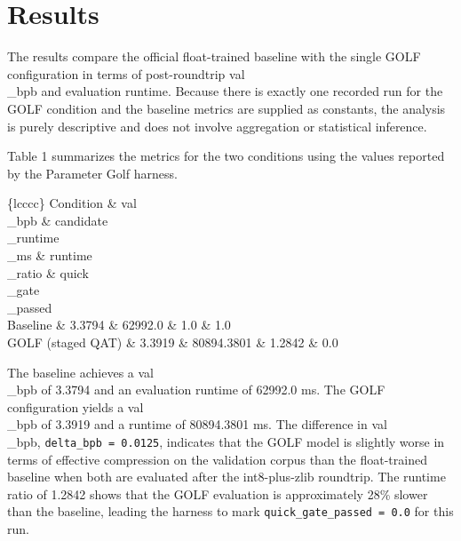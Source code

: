 \documentclass{article}
\begin{document}
\section{Results}

\label{sec:results}

The results compare the official float-trained baseline with the single GOLF configuration in terms of post-roundtrip val\\_bpb and evaluation runtime. Because there is exactly one recorded run for the GOLF condition and the baseline metrics are supplied as constants, the analysis is purely descriptive and does not involve aggregation or statistical inference.

Table 1 summarizes the metrics for the two conditions using the values reported by the Parameter Golf harness.

\begin{table}[h]
\centering
\caption{Lane\_3 metrics for the official float-trained baseline and the single staged-QAT GOLF configuration. All numbers are taken directly from the Parameter Golf records. Lower val\_bpb and runtime are better; the quick-gate requires runtime\_ratio  PROT0  1.10.}
\begin{tabular}\{lcccc\}
\hline
Condition \& val\\_bpb \& candidate\\_runtime\\_ms \& runtime\\_ratio \& quick\\_gate\\_passed \\
\hline
Baseline \& 3.3794 \& 62992.0 \& 1.0 \& 1.0 \\
GOLF (staged QAT) \& 3.3919 \& 80894.3801 \& 1.2842 \& 0.0 \\
\hline
\end{tabular}
\end{table}

The baseline achieves a val\\_bpb of 3.3794 and an evaluation runtime of 62992.0 ms. The GOLF configuration yields a val\\_bpb of 3.3919 and a runtime of 80894.3801 ms. The difference in val\\_bpb, \texttt{delta\_bpb = 0.0125}, indicates that the GOLF model is slightly worse in terms of effective compression on the validation corpus than the float-trained baseline when both are evaluated after the int8-plus-zlib roundtrip. The runtime ratio of 1.2842 shows that the GOLF evaluation is approximately 28\% slower than the baseline, leading the harness to mark \texttt{quick\_gate\_passed = 0.0} for this run.
\end{document}
